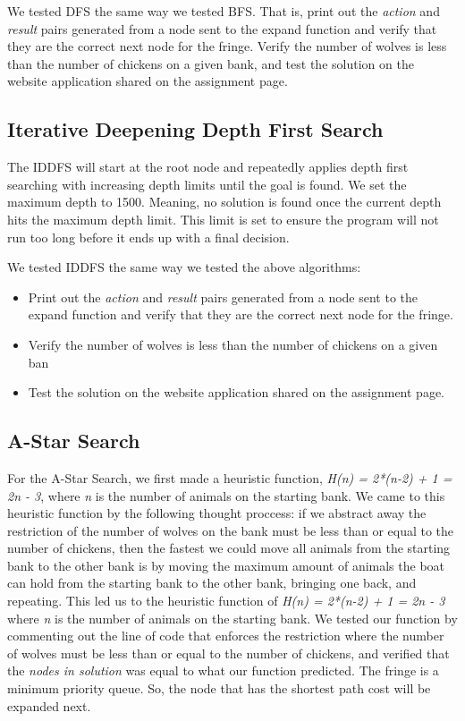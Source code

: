\documentclass[onecolumn,draftclsnofoot, 10pt, compsoc]{IEEEtran}
\begin{document}
	We tested DFS the same way we tested BFS.
	That is, print out the \textit{action} and \textit{result} pairs generated from a node sent to the expand function and verify that they are the correct next node for the fringe. 
	Verify the number of wolves is less than the number of chickens on a given bank, and test the solution on the website application shared on the assignment page.
	
	
    \subsection{Iterative Deepening Depth First Search}
    The IDDFS will start at the root node and repeatedly applies depth first searching with increasing depth limits until the goal is found. We set the maximum depth to 1500. Meaning, no solution is found once the current depth hits the maximum depth limit. This limit is set to ensure the program will not run too long before it ends up with a final decision.

	We tested IDDFS the same way we tested the above algorithms:
	\begin{itemize}
		\item Print out the \textit{action} and \textit{result} pairs generated from a node sent to the expand function and verify that they are the correct next node for the fringe.
		
		\item Verify the number of wolves is less than the number of chickens on a given ban
		
		\item Test the solution on the website application shared on the assignment page.
	\end{itemize}

	\subsection{A-Star Search}
	For the A-Star Search, we first made a heuristic function, \textit{H(n) = 2*(n-2) + 1 = 2n - 3}, where \textit{n} is the number of animals on the starting bank. We came to this heuristic function by the following thought proccess: if we abstract away the restriction of the number of wolves on the bank must be less than or equal to the number of chickens, then the fastest we could move all animals from the starting bank to the other bank is by moving the maximum amount of animals the boat can hold from the starting bank to the other bank, bringing one back, and repeating. This led us to the heuristic function of \textit{H(n) = 2*(n-2) + 1 = 2n - 3} where \textit{n} is the number of animals on the starting bank.
	We tested our function by commenting out the line of code that enforces the restriction where the number of wolves must be less than or equal to the number of chickens, and verified that the \textit{nodes in solution} was equal to what our function predicted.
	The fringe is a minimum priority queue. So, the node that has the shortest path cost will be expanded next.
	
\end{document}
